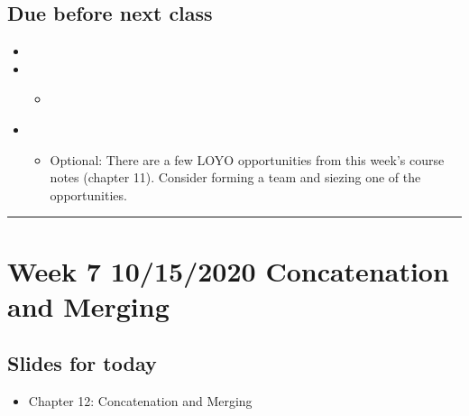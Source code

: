 \documentclass[letterpaper,10pt,english]{sphinxmanual}
\begin{document}
\subsection{Due before next class}
\label{\detokenize{course-schedule:id10}}\begin{itemize}
\item {} 

\item {} 
\begin{itemize}
\item {} 
{\hyperref[\detokenize{chapter-12-concat-and-merge::doc}]{}}

\end{itemize}

\item {} 
\begin{itemize}
\item {} 
Optional: There are a few LOYO opportunities from this week’s course notes (chapter 11).  Consider forming a team and siezing one of the opportunities.

\end{itemize}

\end{itemize}


\bigskip\hrule\bigskip



\section{Week 7 \sphinxhyphen{} 10/15/2020 \sphinxhyphen{} Concatenation and Merging}
\label{\detokenize{course-schedule:week-7-10-15-2020-concatenation-and-merging}}

\subsection{Slides for today}
\label{\detokenize{course-schedule:id11}}\begin{itemize}
\item {} 
Chapter 12: Concatenation and Merging

\end{itemize}
\end{document}
